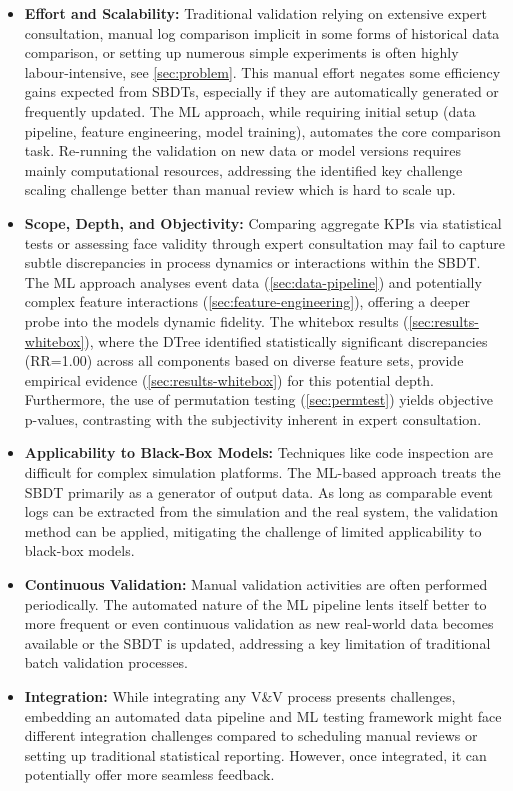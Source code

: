 \begin{itemize}
  \item \textbf{Effort and Scalability:} Traditional validation relying on extensive expert consultation, manual log comparison implicit in some forms of historical data comparison, or setting up numerous simple experiments is often highly labour-intensive, see \autoref{sec:problem}. This manual effort negates some efficiency gains expected from SBDTs, especially if they are automatically generated or frequently updated. The ML approach, while requiring initial setup (data pipeline, feature engineering, model training), automates the core comparison task. Re-running the validation on new data or model versions requires mainly computational resources, addressing the identified key challenge scaling challenge better than manual review which is hard to scale up.

  \item \textbf{Scope, Depth, and Objectivity:} Comparing aggregate KPIs via statistical tests or assessing face validity through expert consultation may fail to capture subtle discrepancies in process dynamics or interactions within the SBDT. The ML approach analyses event data (\autoref{sec:data-pipeline}) and potentially complex feature interactions (\autoref{sec:feature-engineering}), offering a deeper probe into the models dynamic fidelity. The whitebox results (\autoref{sec:results-whitebox}), where the DTree identified statistically significant discrepancies (RR=1.00) across all components based on diverse feature sets, provide empirical evidence (\autoref{sec:results-whitebox}) for this potential depth. Furthermore, the use of permutation testing (\autoref{sec:permtest}) yields objective p-values, contrasting with the subjectivity inherent in expert consultation.

  \item \textbf{Applicability to Black-Box Models:} Techniques like code inspection are difficult for complex simulation platforms. The ML-based approach treats the SBDT primarily as a generator of output data. As long as comparable event logs can be extracted from the simulation and the real system, the validation method can be applied, mitigating the challenge of limited applicability to black-box models.

  \item \textbf{Continuous Validation:} Manual validation activities are often performed periodically. The automated nature of the ML pipeline lents itself better to more frequent or even continuous validation as new real-world data becomes available or the SBDT is updated, addressing a key limitation of traditional batch validation processes.

  \item \textbf{Integration:} While integrating any V\&V process presents challenges, embedding an automated data pipeline and ML testing framework might face different integration challenges compared to scheduling manual reviews or setting up traditional statistical reporting. However, once integrated, it can potentially offer more seamless feedback.
\end{itemize}

